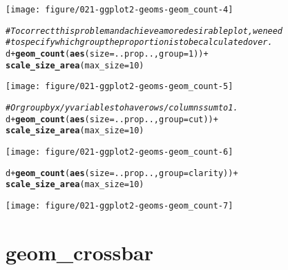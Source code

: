 \documentclass[a4paper,titlepage]{tufte-handout}\usepackage[]{graphicx}\usepackage[]{color}
\makeatletter
\def\maxwidth{ %
  \ifdim\Gin@nat@width>\linewidth
    \linewidth
  \else
    \Gin@nat@width
  \fi
}
\newcommand{\hlnum}[1]{\textcolor[rgb]{0.686,0.059,0.569}{#1}}%
\newcommand{\hlcom}[1]{\textcolor[rgb]{0.678,0.584,0.686}{\textit{#1}}}%
\newcommand{\hlopt}[1]{\textcolor[rgb]{0,0,0}{#1}}%
\newcommand{\hlstd}[1]{\textcolor[rgb]{0.345,0.345,0.345}{#1}}%
\newcommand{\hlkwc}[1]{\textcolor[rgb]{0.333,0.667,0.333}{#1}}%
\newcommand{\hlkwd}[1]{\textcolor[rgb]{0.737,0.353,0.396}{\textbf{#1}}}%
\newenvironment{kframe}{%
 \def\at@end@of@kframe{}%
 \ifinner\ifhmode%
  \def\at@end@of@kframe{\end{minipage}}%
  \begin{minipage}{\columnwidth}%
 \fi\fi%
 \def\FrameCommand##1{\hskip\@totalleftmargin \hskip-\fboxsep
 \colorbox{shadecolor}{##1}\hskip-\fboxsep
     \hskip-\linewidth \hskip-\@totalleftmargin \hskip\columnwidth}%
 \MakeFramed {\advance\hsize-\width
   \@totalleftmargin\z@ \linewidth\hsize
   \@setminipage}}%
 {\par\unskip\endMakeFramed%
 \at@end@of@kframe}
\newenvironment{knitrout}{}{} %
\makeatother
\begin{document}
\begin{knitrout}
\begin{kframe}
\begin{alltt}
\end{alltt}
\end{kframe}
\texttt{[image: figure/021-ggplot2-geoms-geom\_count-4]} 
\begin{kframe}\begin{alltt}
\hlcom{# To correct this problem and achieve a more desirable plot, we need}
\hlcom{# to specify which group the proportion is to be calculated over.}
\hlstd{d} \hlopt{+} \hlkwd{geom_count}\hlstd{(}\hlkwd{aes}\hlstd{(}\hlkwc{size} \hlstd{= ..prop..,} \hlkwc{group} \hlstd{=} \hlnum{1}\hlstd{))} \hlopt{+}
  \hlkwd{scale_size_area}\hlstd{(}\hlkwc{max_size} \hlstd{=} \hlnum{10}\hlstd{)}
\end{alltt}
\end{kframe}
\texttt{[image: figure/021-ggplot2-geoms-geom\_count-5]} 
\begin{kframe}\begin{alltt}
\hlcom{# Or group by x/y variables to have rows/columns sum to 1.}
\hlstd{d} \hlopt{+} \hlkwd{geom_count}\hlstd{(}\hlkwd{aes}\hlstd{(}\hlkwc{size} \hlstd{= ..prop..,} \hlkwc{group} \hlstd{= cut))} \hlopt{+}
  \hlkwd{scale_size_area}\hlstd{(}\hlkwc{max_size} \hlstd{=} \hlnum{10}\hlstd{)}
\end{alltt}
\end{kframe}
\texttt{[image: figure/021-ggplot2-geoms-geom\_count-6]} 
\begin{kframe}\begin{alltt}
\hlstd{d} \hlopt{+} \hlkwd{geom_count}\hlstd{(}\hlkwd{aes}\hlstd{(}\hlkwc{size} \hlstd{= ..prop..,} \hlkwc{group} \hlstd{= clarity))} \hlopt{+}
  \hlkwd{scale_size_area}\hlstd{(}\hlkwc{max_size} \hlstd{=} \hlnum{10}\hlstd{)}
\end{alltt}
\end{kframe}
\texttt{[image: figure/021-ggplot2-geoms-geom\_count-7]} 

\end{knitrout}


\section{geom\_crossbar}
\end{document}
